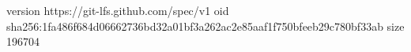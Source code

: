 version https://git-lfs.github.com/spec/v1
oid sha256:1fa486f684d06662736bd32a01bf3a262ac2e85aaf1f750bfeeb29c780bf33ab
size 196704
